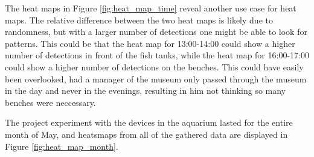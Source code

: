 The heat maps in Figure \ref{fig:heat_map_time} reveal another use case for heat maps. The relative difference between the two heat maps is likely due to randomness, but with a larger number of detections one might be able to look for patterns. This could be that the heat map for 13:00-14:00 could show a higher number of detections in front of the fish tanks, while the heat map for 16:00-17:00 could show a higher number of detections on the benches. This could have easily been overlooked, had a manager of the museum only passed through the museum in the day and never in the evenings, resulting in him not thinking so many benches were neccessary. 

The project experiment with the devices in the aquarium lasted for the entire month of May, and heatsmaps from all of the gathered data are displayed in Figure \ref{fig:heat_map_month}. 

